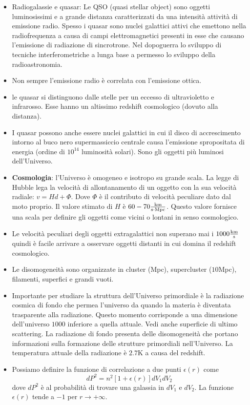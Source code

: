 \documentclass[11pt,a4paper]{article}
\begin{document}
\begin{itemize}
\item Radiogalassie e quasar: Le QSO (quasi stellar object) sono oggetti luminosissimi e a grande distanza caratterizzati da una intensità attività di emissione radio. Spesso i quasar sono nuclei galattici attivi che emettono nella radiofrequenza a causa di campi elettromagnetici presenti in esse che causano l'emissione di radiazione di sincrotrone. Nel dopoguerra lo sviluppo di tecniche interferometriche a lunga base a permesso lo sviluppo della radioastronomia.

\item Non sempre l'emissione radio è correlata con l'emissione ottica.

\item le quasar si distinguono dalle stelle per un eccesso di ultravioletto e infrarosso. Esse hanno un altissimo redshift cosmologico (dovuto alla distanza).

\item I quasar possono anche essere nuclei galattici in cui il disco di accrescimento intorno al buco nero supermassiccio centrale causa l'emissione spropositata di energia (ordine di $10^{14}$ luminosità solari). Sono gli oggetti più luminosi dell'Universo.

\item \textbf{Cosmologia}: l'Universo è omogeneo e isotropo su grande scala. La legge di Hubble lega la velocità di allontanamento di un oggetto con la sua velocità radiale: $v = Hd + \Phi$. Dove $\Phi$ è il contributo di velocità peculiare dato dal moto proprio. Il valore stimato di $H$ è $60-70 \si{\frac{\kilo \meter}{\second \cdot \text{Mpc}}}$. Questo valore fornisce una scala per definire gli oggetti come vicini o lontani in senso cosmologico.

\item Le velocità peculiari degli oggetti extragalattici non superano mai i $1000 \si{\frac{k \meter}{\second}}$ quindi è facile arrivare a osservare oggetti distanti in cui domina il redshift cosmologico.

\item Le disomogeneità sono organizzate in cluster (Mpc), supercluster ($10$Mpc), filamenti, superfici e grandi vuoti.

\item Importante per studiare la struttura dell'Universo primordiale è la radiazione cosmica di fondo che permea l'universo da quando la materia è diventata trasparente alla radiazione. Questo momento corrisponde a una dimensione dell'universo $1000$ inferiore a quella attuale. Vedi anche superficie di ultimo scattering. La radiazione di fondo presenta delle disomogeneità che portano informazioni sulla formazione delle strutture primordiali nell'Universo. La temperatura attuale della radiazione è $2.7\si{\kelvin}$ a causa del redshift.
\item Possiamo definire la funzione di correlazione a due punti $\epsilon(r)$ come 
\begin{equation}
dP^2 = n^2 \left[ 1+\epsilon(r) \right] dV_1 dV_2
\end{equation}
dove $dP^2$ è al probabilità di trovare una galassia in  $dV_1$ e $ dV_2$. La funzione $\epsilon(r)$ tende a $-1$ per $r \rightarrow +\infty$.


\end{itemize}
\end{document}
